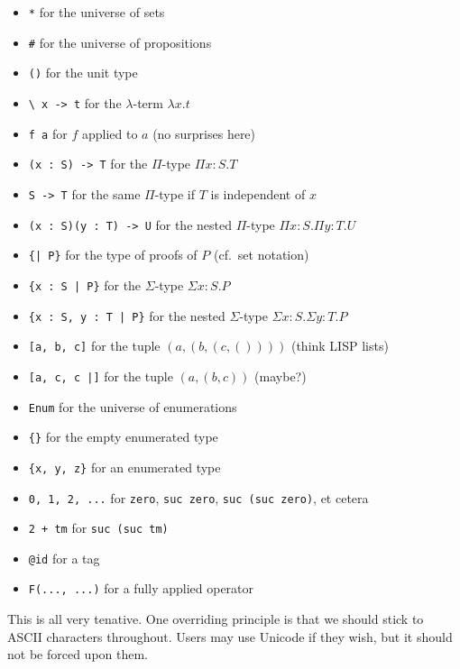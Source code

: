 \begin{itemize}
\item \verb!*! for the universe of sets
\item \verb!#! for the universe of propositions
\item \verb|()| for the unit type
\item \verb!\ x -> t! for the $\lambda$-term $\lambda x.t$
\item \verb|f a| for $f$ applied to $a$ (no surprises here)
\item \verb!(x : S) -> T! for the $\Pi$-type $\Pi x:S. T$
\item \verb!S -> T! for the same $\Pi$-type if $T$ is independent of $x$
\item \verb!(x : S)(y : T) -> U! for the nested $\Pi$-type $\Pi x:S. \Pi y:T. U$
\item \verb!{| P}! for the type of proofs of $P$ (cf.\ set notation)
\item \verb!{x : S | P}! for the $\Sigma$-type $\Sigma x:S. P$
\item \verb!{x : S, y : T | P}! for the nested $\Sigma$-type $\Sigma x:S. \Sigma y:T. P$
\item \verb![a, b, c]! for the tuple $(a, (b, (c, ())))$ (think LISP lists)
\item \verb![a, c, c |]! for the tuple $(a, (b, c))$ (maybe?)
\item \verb!Enum! for the universe of enumerations
\item \verb!{}! for the empty enumerated type
\item \verb!{x, y, z}! for an enumerated type
\item \verb!0, 1, 2, ...! for \verb!zero!, \verb!suc zero!, \verb!suc (suc zero)!, et cetera
\item \verb!2 + tm! for \verb!suc (suc tm)!
\item \verb!@id! for a tag
\item \verb!F(..., ...)! for a fully applied operator
\end{itemize}



This is all very tenative. One overriding principle is that we should stick to ASCII
characters throughout. Users may use Unicode if they wish, but it should not be
forced upon them.
